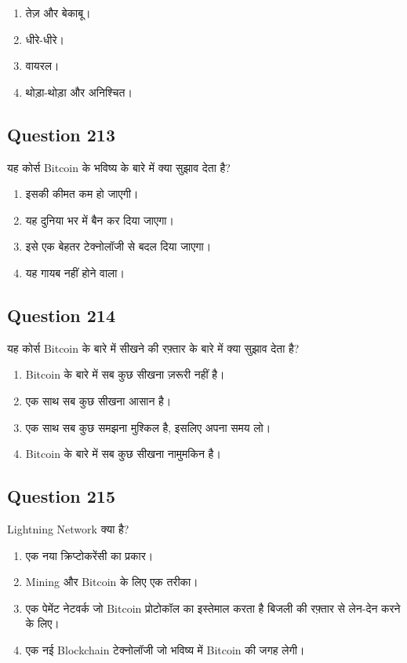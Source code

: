 \documentclass[12pt,a4paper]{article}
\begin{document}
\begin{enumerate}[label=\Alph*., leftmargin=*]
\item तेज़ और बेकाबू।
\item धीरे-धीरे।
\item वायरल।
\item थोड़ा-थोड़ा और अनिश्चित।
\end{enumerate}

\bigskip


\subsection*{Question 213}
यह कोर्स Bitcoin के भविष्य के बारे में क्या सुझाव देता है?

\begin{enumerate}[label=\Alph*., leftmargin=*]
\item इसकी कीमत कम हो जाएगी।
\item यह दुनिया भर में बैन कर दिया जाएगा।
\item इसे एक बेहतर टेक्नोलॉजी से बदल दिया जाएगा।
\item यह गायब नहीं होने वाला।
\end{enumerate}

\bigskip


\subsection*{Question 214}
यह कोर्स Bitcoin के बारे में सीखने की रफ़्तार के बारे में क्या सुझाव देता है?

\begin{enumerate}[label=\Alph*., leftmargin=*]
\item Bitcoin के बारे में सब कुछ सीखना ज़रूरी नहीं है।
\item एक साथ सब कुछ सीखना आसान है।
\item एक साथ सब कुछ समझना मुश्किल है, इसलिए अपना समय लो।
\item Bitcoin के बारे में सब कुछ सीखना नामुमकिन है।
\end{enumerate}

\bigskip


\subsection*{Question 215}
Lightning Network क्या है?

\begin{enumerate}[label=\Alph*., leftmargin=*]
\item एक नया क्रिप्टोकरेंसी का प्रकार।
\item Mining और Bitcoin के लिए एक तरीका।
\item एक पेमेंट नेटवर्क जो Bitcoin प्रोटोकॉल का इस्तेमाल करता है बिजली की रफ़्तार से लेन-देन करने के लिए।
\item एक नई Blockchain टेक्नोलॉजी जो भविष्य में Bitcoin की जगह लेगी।
\end{enumerate}
\end{document}

